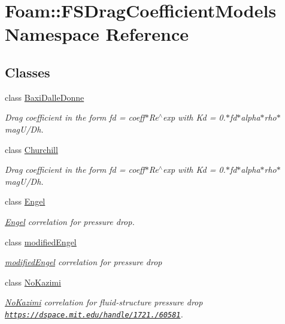 \hypertarget{namespaceFoam_1_1FSDragCoefficientModels}{}\section{Foam\+:\+:F\+S\+Drag\+Coefficient\+Models Namespace Reference}
\label{namespaceFoam_1_1FSDragCoefficientModels}
\subsection*{Classes}
\begin{DoxyCompactItemize}
\item 
class \hyperlink{classFoam_1_1FSDragCoefficientModels_1_1BaxiDalleDonne}{Baxi\+Dalle\+Donne}
\begin{DoxyCompactList}\small\item\em Drag coefficient in the form fd = coeff$\ast$\+Re$^\wedge$exp with Kd = 0.$\ast$fd$\ast$alpha$\ast$rho$\ast$mag\+U/\+Dh. \end{DoxyCompactList}\item 
class \hyperlink{classFoam_1_1FSDragCoefficientModels_1_1Churchill}{Churchill}
\begin{DoxyCompactList}\small\item\em Drag coefficient in the form fd = coeff$\ast$\+Re$^\wedge$exp with Kd = 0.$\ast$fd$\ast$alpha$\ast$rho$\ast$mag\+U/\+Dh. \end{DoxyCompactList}\item 
class \hyperlink{classFoam_1_1FSDragCoefficientModels_1_1Engel}{Engel}
\begin{DoxyCompactList}\small\item\em \hyperlink{classFoam_1_1FSDragCoefficientModels_1_1Engel}{Engel} correlation for pressure drop. \end{DoxyCompactList}\item 
class \hyperlink{classFoam_1_1FSDragCoefficientModels_1_1modifiedEngel}{modified\+Engel}
\begin{DoxyCompactList}\small\item\em \hyperlink{classFoam_1_1FSDragCoefficientModels_1_1modifiedEngel}{modified\+Engel} correlation for pressure drop \end{DoxyCompactList}\item 
class \hyperlink{classFoam_1_1FSDragCoefficientModels_1_1NoKazimi}{No\+Kazimi}
\begin{DoxyCompactList}\small\item\em \hyperlink{classFoam_1_1FSDragCoefficientModels_1_1NoKazimi}{No\+Kazimi} correlation for fluid-\/structure pressure drop \href{https://dspace.mit.edu/handle/1721.1/60581}{\tt https\+://dspace.\+mit.\+edu/handle/1721./60581}. \end{DoxyCompactList}\item 

\end{DoxyCompactItemize}
